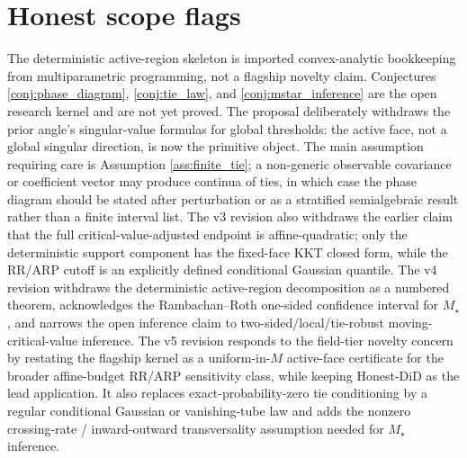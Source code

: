 \documentclass[11pt]{article}
\theoremstyle{definition}
\theoremstyle{plain}
\theoremstyle{remark}
\begin{document}
\section{Honest scope flags}
The deterministic active-region skeleton is imported convex-analytic
bookkeeping from multiparametric programming, not a flagship novelty claim.
Conjectures \ref{conj:phase_diagram}, \ref{conj:tie_law}, and
\ref{conj:mstar_inference} are the open research kernel and are not yet
proved.  The proposal deliberately withdraws
the prior angle's singular-value formulas for global thresholds: the active
face, not a global singular direction, is now the primitive object.  The main
assumption requiring care is Assumption \ref{ass:finite_tie}; a non-generic
observable covariance or coefficient vector may produce continua of ties, in
which case the phase diagram should be stated after perturbation or as a
stratified semialgebraic result rather than a finite interval list.
The v3 revision also withdraws the earlier claim that the full
critical-value-adjusted endpoint is affine-quadratic; only the deterministic
support component has the fixed-face KKT closed form, while the RR/ARP cutoff
is an explicitly defined conditional Gaussian quantile.
The v4 revision withdraws the deterministic active-region decomposition as a
numbered theorem, acknowledges the Rambachan--Roth one-sided confidence
interval for \(M_\star\), and narrows the open inference claim to
two-sided/local/tie-robust moving-critical-value inference.
The v5 revision responds to the field-tier novelty concern by restating the
flagship kernel as a uniform-in-\(M\) active-face certificate for the broader
affine-budget RR/ARP sensitivity class, while keeping Honest-DiD as the lead
application.  It also replaces exact-probability-zero tie conditioning by a
regular conditional Gaussian or vanishing-tube law and adds the nonzero
crossing-rate / inward-outward transversality assumption needed for
\(M_\star\) inference.
\end{document}
